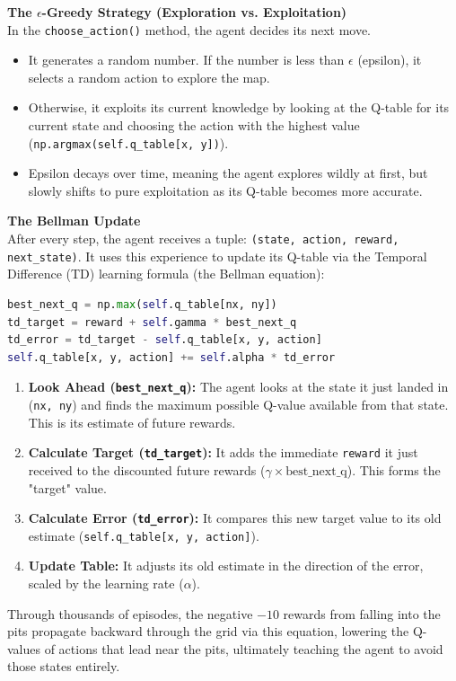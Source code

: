 \textbf{\textcolor{primary}{The $\epsilon$-Greedy Strategy (Exploration vs. Exploitation)}} \\
In the \texttt{choose\_action()} method, the agent decides its next move.
\begin{itemize}
    \item It generates a random number. If the number is less than $\epsilon$ (epsilon), it selects a random action to explore the map.
    \item Otherwise, it exploits its current knowledge by looking at the Q-table for its current state and choosing the action with the highest value (\texttt{np.argmax(self.q\_table[x, y])}).
    \item Epsilon decays over time, meaning the agent explores wildly at first, but slowly shifts to pure exploitation as its Q-table becomes more accurate.
\end{itemize}

\textbf{\textcolor{primary}{The Bellman Update}} \\
After every step, the agent receives a tuple: \texttt{(state, action, reward, next\_state)}. It uses this experience to update its Q-table via the Temporal Difference (TD) learning formula (the Bellman equation):

\begin{lstlisting}[language=Python]
best_next_q = np.max(self.q_table[nx, ny])
td_target = reward + self.gamma * best_next_q
td_error = td_target - self.q_table[x, y, action]
self.q_table[x, y, action] += self.alpha * td_error
\end{lstlisting}

\begin{enumerate}
    \item \textbf{Look Ahead (\texttt{best\_next\_q}):} The agent looks at the state it just landed in (\texttt{nx, ny}) and finds the maximum possible Q-value available from that state. This is its estimate of future rewards.
    \item \textbf{Calculate Target (\texttt{td\_target}):} It adds the immediate \texttt{reward} it just received to the discounted future rewards ($\gamma \times \text{best\_next\_q}$). This forms the "target" value.
    \item \textbf{Calculate Error (\texttt{td\_error}):} It compares this new target value to its old estimate (\texttt{self.q\_table[x, y, action]}).
    \item \textbf{Update Table:} It adjusts its old estimate in the direction of the error, scaled by the learning rate ($\alpha$).
\end{enumerate}

Through thousands of episodes, the negative $-10$ rewards from falling into the pits propagate backward through the grid via this equation, lowering the Q-values of actions that lead near the pits, ultimately teaching the agent to avoid those states entirely.